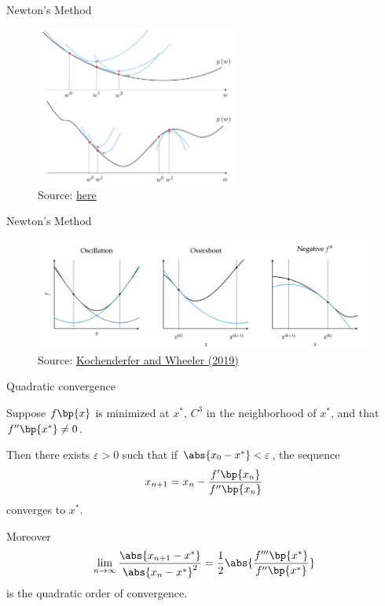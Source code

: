 \documentclass[11pt,xcolor={dvipsnames},aspectratio=159,hyperref={pdftex,pdfpagemode=UseNone,hidelinks,pdfdisplaydoctitle=true},usepdftitle=false]{beamer}
\begin{document}
    \begin{frame}{Newton's Method}
        \centering
        \begin{figure}
            \includegraphics[width=0.6\textwidth]{newton.png}
            \caption{Source: \href{https://jermwatt.github.io/machine_learning_refined/notes/4_Second_order_methods/4_4_Newtons.html}{here}}
            \end{figure}
        \end{frame}


    \begin{frame}{Newton's Method}
        \centering
        \begin{figure}

        \includegraphics[width=1\textwidth]{newton_failure.png}
        \caption{Source: \href{https://mitpress.mit.edu/9780262039420/}{Kochenderfer and Wheeler (2019)}}
        \end{figure}

    \end{frame}  


    \begin{frame}{Quadratic convergence}
        \begin{theorem}
            Suppose $f\bp{x}$ is minimized at $x^*$, $C^3$ in the neighborhood of $x^*$, and that $f^{\prime\prime}\bp{x^*} \neq 0$. 
            
            Then there exists $\varepsilon > 0$ such that if $\abs{x_0 - x^*} < \varepsilon$, the sequence $$x_{n+1} = x_n - \frac{f^\prime\bp{x_n}}{f^{\prime\prime} \bp{x_n}}$$ converges to $x^*$.
            
            Moreover $$\lim_{n \rightarrow \infty} \frac{\abs{x_{n+1} - x^*}}{\abs{x_n - x^*}^2} = \frac{1}{2} \abs{\frac{f^{\prime\prime\prime}\bp{x^*}}{f^{\prime\prime}\bp{x^*}}}$$ is the quadratic order of convergence.
            \end{theorem}
        \end{frame}
\end{document}
